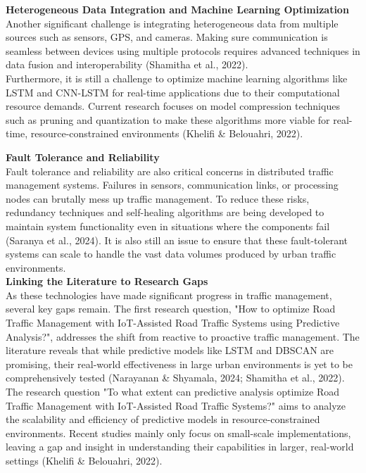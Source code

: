 \documentclass[12pt,a4paper]{article}
\begin{document}
\textbf{Heterogeneous Data Integration and Machine Learning Optimization} \\

Another significant challenge is integrating heterogeneous data from multiple sources such as sensors, GPS, and cameras. Making sure communication is seamless between devices using multiple protocols requires advanced techniques in data fusion and interoperability (Shamitha et al., 2022).\\  

Furthermore, it is still a challenge to optimize machine learning algorithms like LSTM and CNN-LSTM for real-time applications due to their computational resource demands. Current research focuses on model compression techniques such as pruning and quantization to make these algorithms more viable for real-time, resource-constrained environments (Khelifi \& Belouahri, 2022). \\

\newpage

\textbf{Fault Tolerance and Reliability }\\

Fault tolerance and reliability are also critical concerns in distributed traffic management systems. Failures in sensors, communication links, or processing nodes can brutally mess up traffic management. To reduce these risks, redundancy techniques and self-healing algorithms are being developed to maintain system functionality even in situations where the components fail (Saranya et al., 2024). It is also still an issue to ensure that these fault-tolerant systems can scale to handle the vast data volumes produced by urban traffic environments. \\

\textbf{Linking the Literature to Research Gaps} \\

As these technologies have made significant progress in traffic management, several key gaps remain. The first research question, "How to optimize Road Traffic Management with IoT-Assisted Road Traffic Systems using Predictive Analysis?", addresses the shift from reactive to proactive traffic management. The literature reveals that while predictive models like LSTM and DBSCAN are promising, their real-world effectiveness in large urban environments is yet to be comprehensively tested (Narayanan \& Shyamala, 2024; Shamitha et al., 2022). \\

The research question "To what extent can predictive analysis optimize Road Traffic Management with IoT-Assisted Road Traffic Systems?" aims to analyze the scalability and efficiency of predictive models in resource-constrained environments. Recent studies mainly only focus on small-scale implementations, leaving a gap and insight in understanding their capabilities in larger, real-world settings (Khelifi \& Belouahri, 2022). \\
\end{document}
